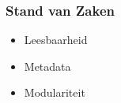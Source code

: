 \begin{frame}
  \frametitle{Stand van Zaken}
  \begin{itemize}
    \item Leesbaarheid
    \item Metadata
    \item Modulariteit
  \end{itemize}
  \vskip4mm
  \begin{itemize}
  \end{itemize}
\end{frame}


